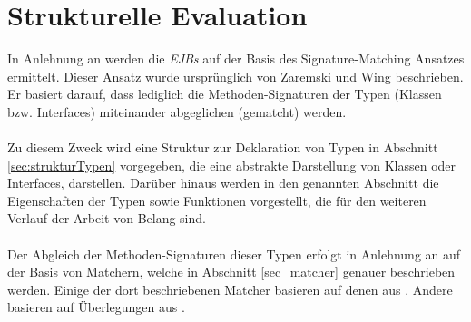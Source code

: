 \section{Strukturelle Evaluation}
In Anlehnung an \cite{hummel08} werden die \emph{EJBs} auf der Basis des Signature-Matching Ansatzes ermittelt. Dieser Ansatz wurde ursprünglich von Zaremski und Wing \cite{moormann} beschrieben. Er basiert darauf, dass lediglich die Methoden-Signaturen der Typen (Klassen bzw. \Gls{Interface}s) miteinander abgeglichen (gematcht) werden. 
\\\\
Zu diesem Zweck wird eine Struktur zur Deklaration von Typen in Abschnitt \ref{sec:strukturTypen} vorgegeben, die eine abstrakte Darstellung von Klassen oder \Gls{Interface}s, darstellen. Darüber hinaus werden in den genannten Abschnitt die Eigenschaften der Typen sowie Funktionen vorgestellt, die für den weiteren Verlauf der Arbeit von Belang sind.
\\\\
Der Abgleich der Methoden-Signaturen dieser Typen erfolgt in Anlehnung an \cite{moormann} auf der Basis von Matchern, welche in Abschnitt \ref{sec_matcher} genauer beschrieben werden. Einige der dort beschriebenen Matcher basieren auf denen aus \cite{moormann}. Andere basieren auf Überlegungen aus \cite{hummel08}.
